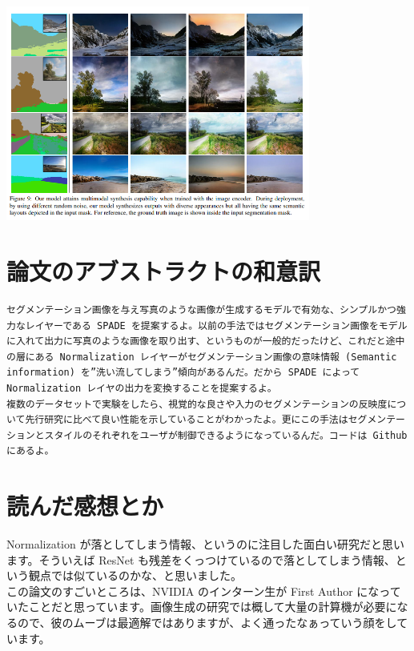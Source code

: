 \documentclass[a4paper, dvipdfmx, 10pt]{article}
\begin{document}
\begin{center}
\includegraphics[width=10cm]{./result2.png}
\end{center}
\section{論文のアブストラクトの和意訳}
\label{sec:orgab6545a}
\begin{verbatim}
セグメンテーション画像を与え写真のような画像が生成するモデルで有効な、シンプルかつ強力なレイヤーである SPADE を提案するよ。以前の手法ではセグメンテーション画像をモデルに入れて出力に写真のような画像を取り出す、というものが一般的だったけど、これだと途中の層にある Normalization レイヤーがセグメンテーション画像の意味情報 (Semantic information) を”洗い流してしまう”傾向があるんだ。だから SPADE によって Normalization レイヤの出力を変換することを提案するよ。
複数のデータセットで実験をしたら、視覚的な良さや入力のセグメンテーションの反映度について先行研究に比べて良い性能を示していることがわかったよ。更にこの手法はセグメンテーションとスタイルのそれぞれをユーザが制御できるようになっているんだ。コードは Github にあるよ。
\end{verbatim}

\section{読んだ感想とか}
\label{sec:orgb68a5b8}
Normalization が落としてしまう情報、というのに注目した面白い研究だと思います。そういえば ResNet も残差をくっつけているので落としてしまう情報、という観点では似ているのかな、と思いました。\\

この論文のすごいところは、NVIDIA のインターン生が First Author になっていたことだと思っています。画像生成の研究では概して大量の計算機が必要になるので、彼のムーブは最適解ではありますが、よく通ったなぁっていう顔をしています。\\
\end{document}
